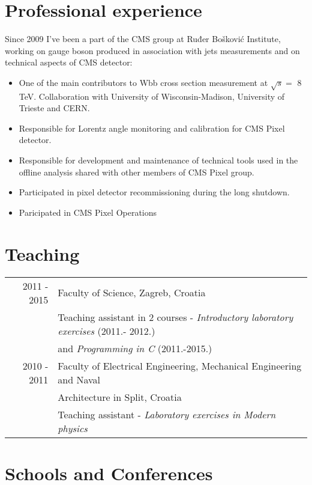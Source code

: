 \section*{Professional experience}

Since 2009 I've been a part of the CMS group at Ruđer Bošković Institute, working on gauge boson produced in association with jets measurements and on technical aspects of CMS detector:
\begin{itemize}
\item One of the main contributors to Wbb cross section measurement at $\sqrt{s} =$ 8 TeV. Collaboration with University of Wisconsin-Madison, University of Trieste and CERN.
\item Responsible for Lorentz angle monitoring and calibration for CMS Pixel detector.
\item Responsible for development and maintenance of technical tools used in the offline analysis shared with other members of CMS Pixel group.
\item Participated in pixel detector recommissioning during the long shutdown. 
\item Paricipated in CMS Pixel Operations
\end{itemize}



\section*{Teaching}

\begin{tabular}{r | l}
  2011 - 2015 & Faculty of Science, Zagreb, Croatia \\ & Teaching assistant in 2 courses - \textit{Introductory laboratory exercises} (2011.- 2012.) \\ & and \textit{Programming in C} (2011.-2015.) \\[5pt]
  2010 - 2011 & Faculty of Electrical Engineering, Mechanical Engineering and Naval \\ & Architecture in Split, Croatia \\ & Teaching assistant - \textit{Laboratory exercises in Modern physics} 
\end{tabular}

\section*{Schools and Conferences}

